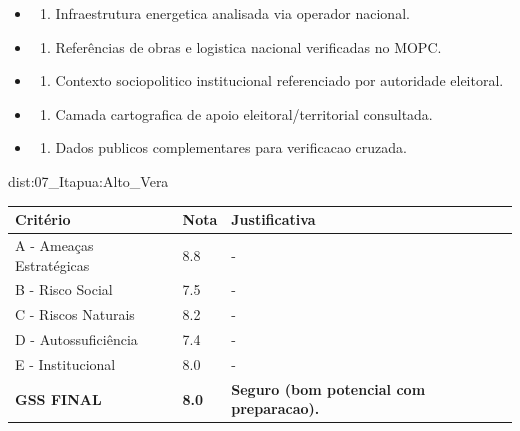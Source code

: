 {\begin{itemize}
\item
  \begin{enumerate}
  \def\labelenumi{\arabic{enumi})}
  \setcounter{enumi}{7}
  \tightlist
  \item
    Infraestrutura energetica analisada via operador nacional.
  \end{enumerate}
\item
  \begin{enumerate}
  \def\labelenumi{\arabic{enumi})}
  \setcounter{enumi}{8}
  \tightlist
  \item
    Referências de obras e logistica nacional verificadas no MOPC.
  \end{enumerate}
\item
  \begin{enumerate}
  \def\labelenumi{\arabic{enumi})}
  \setcounter{enumi}{9}
  \tightlist
  \item
    Contexto sociopolitico institucional referenciado por autoridade
    eleitoral.
  \end{enumerate}
\item
  \begin{enumerate}
  \def\labelenumi{\arabic{enumi})}
  \setcounter{enumi}{10}
  \tightlist
  \item
    Camada cartografica de apoio eleitoral/\allowbreak territorial consultada.
  \end{enumerate}
\item
  \begin{enumerate}
  \def\labelenumi{\arabic{enumi})}
  \setcounter{enumi}{11}
  \tightlist
  \item
    Dados publicos complementares para verificacao cruzada.
  \end{enumerate}
\end{itemize}}{dist:07_Itapua:Alto_Vera}
\begin{table}[ht!]
\small \begin{tabular}{p{3.0cm}p{0.8cm}p{6.0cm}} \toprule
\textbf{Critério} & \textbf{Nota} & \textbf{Justificativa} \\ \midrule
A - Ameaças Estratégicas & 8.8 & - \\
B - Risco Social & 7.5 & - \\
C - Riscos Naturais & 8.2 & - \\
D - Autossuficiência & 7.4 & - \\
E - Institucional & 8.0 & - \\
\midrule \textbf{GSS FINAL} & \textbf{8.0} & \textbf{Seguro (bom potencial com preparacao).} \\ \bottomrule \end{tabular}
\end{table}
